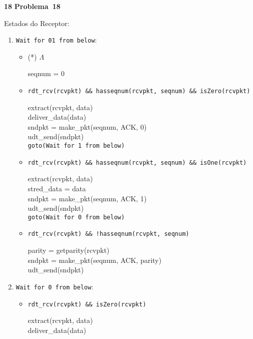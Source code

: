 \documentclass{article}
\newcounter{exe-list}
\newenvironment{exe}[2][Problema]
    {\newcommand{\opt}{(Opcional)}%
    \newcommand{\sketch}[1]{{\bfseries Rascunho:} ##1}%
    \medskip\par\noindent\ifthenelse{\equal{#1}{}}
        {\textbf{\large #2}}
        {\textbf{\large #1~#2}}%
    \medskip\par\noindent}
    {\medskip}
\begin{document}
\begin{exe}{18}
    Estados do Receptor:
    \begin{enumerate}
        \item \texttt{Wait for 01 from below}:
            \begin{itemize}
                \item (*) \(\Lambda\) \par
                    seqnum = 0
                \item \texttt{rdt\_rcv(rcvpkt)
                        \&\& hasseqnum(rcvpkt, seqnum)
                        \&\& isZero(rcvpkt)} \par
                    extract(rcvpkt, data) \\
                    deliver\_data(data) \\
                    sndpkt = make\_pkt(seqnum, ACK, 0) \\
                    udt\_send(sndpkt) \\
                    \texttt{goto(Wait for 1 from below)}
                \item \texttt{rdt\_rcv(rcvpkt)
                        \&\& hasseqnum(rcvpkt, seqnum)
                        \&\& isOne(rcvpkt)} \par
                    extract(rcvpkt, data) \\
                    stred\_data = data \\
                    sndpkt = make\_pkt(seqnum, ACK, 1) \\
                    udt\_send(sndpkt) \\
                    \texttt{goto(Wait for 0 from below)}
                \item \texttt{rdt\_rcv(rcvpkt)
                        \&\& !hasseqnum(rcvpkt, seqnum)} \par
                    parity = getparity(rcvpkt) \\
                    sndpkt = make\_pkt(seqnum, ACK, parity) \\
                    udt\_send(sndpkt)
            \end{itemize}
        \item \texttt{Wait for 0 from below}:
            \begin{itemize}
                \item \texttt{rdt\_rcv(rcvpkt)
                        \&\& isZero(rcvpkt)} \par
                    extract(rcvpkt, data) \\
                    deliver\_data(data) \\

\end{itemize}
\end{enumerate}
\end{exe}
\end{document}
